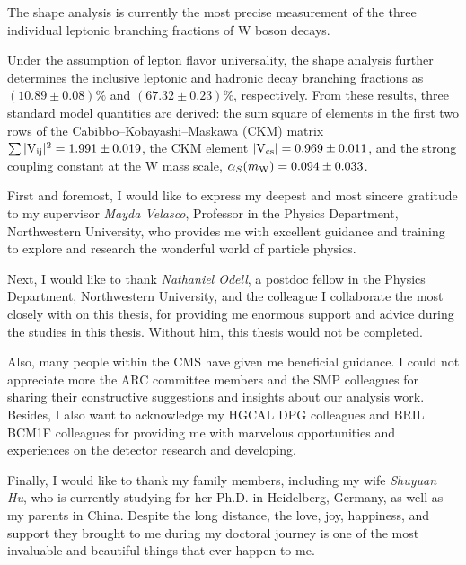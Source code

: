 \documentclass[12pt,reqno]{nuthesis}
\begin{document}
    The shape analysis is currently the most precise measurement of the three individual leptonic branching fractions of W boson decays.
    
    Under the assumption of lepton flavor universality, the shape analysis further determines the inclusive leptonic and hadronic decay branching fractions as $(10.89 \pm 0.08)\%$ and $(67.32 \pm 0.23)\%$, respectively. From these results, three standard model quantities are derived: the sum square of elements in the first two rows of the Cabibbo--Kobayashi--Maskawa (CKM) matrix  $\sum{\ensuremath{\lvert \mathrm{V_{ij}} \rvert}^{2}} = 1.991 \pm 0.019$, the CKM element $\lvert \mathrm{V_{cs}} \rvert = 0.969 \pm 0.011$, and the strong coupling constant at the W mass scale, $\alpha_S(m_\mathrm{W}) = 0.094 \pm 0.033$.


    \acknowledgements

    First and foremost, I would like to express my deepest and most sincere gratitude to my supervisor \textit{Mayda Velasco}, Professor in the Physics Department, Northwestern University, who provides me with excellent guidance and training to explore and research the wonderful world of particle physics. 

    Next, I would like to thank \textit{Nathaniel Odell}, a postdoc fellow in the Physics Department, Northwestern University, and the colleague I collaborate the most closely with on this thesis, for providing me enormous support and advice during the studies in this thesis. Without him, this thesis would not be completed. 

    Also, many people within the CMS have given me beneficial guidance. I could not appreciate more the ARC committee members and the SMP colleagues for sharing their constructive suggestions and insights about our analysis work. Besides, I also want to acknowledge my HGCAL DPG colleagues and BRIL BCM1F colleagues for providing me with marvelous opportunities and experiences on the detector research and developing.

    Finally, I would like to thank my family members, including my wife \textit{Shuyuan Hu}, who is currently studying for her Ph.D. in Heidelberg, Germany, as well as my parents in China. Despite the long distance, the love, joy, happiness, and support they brought to me during my doctoral journey is one of the most invaluable and beautiful things that ever happen to me.



    \clearpage{} 
    \setcounter{tocdepth}{2}
        \tableofcontents	
\end{document}

